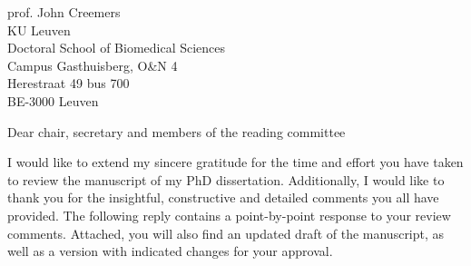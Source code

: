 \documentclass{letter}
\begin{document}
\signature{%
	Arne Van Den Kerchove \\
	\texttt{arne.vandenkerchove@kuleuven.be} \\
	+32 473 32 78 71 \\
}
\address{%
	KU Leuven \\
	Laboratory for Neuro- and Psychophysiology \\
	Campus Gasthuisberg, O\&N 2 \\
	Herestraat 49 bus 1021 \\
	BE-3000 Leuven
}

\begin{letter}{%
	prof. John Creemers \\
	KU Leuven \\
	Doctoral School of Biomedical Sciences \\
	Campus Gasthuisberg, O\&N 4 \\
	Herestraat 49 bus 700 \\
	BE-3000 Leuven

}
\opening{Dear chair, secretary and members of the reading committee}

I would like to extend my sincere gratitude for the time and effort you have taken
to review the manuscript of my PhD dissertation.
Additionally, I would like to thank you for the insightful, constructive and
detailed comments you all have provided.
The following reply contains a point-by-point response to your review comments.
Attached, you will also find an updated draft of the manuscript, as well as a
version with indicated changes for your approval.


\end{letter}
\end{document}
